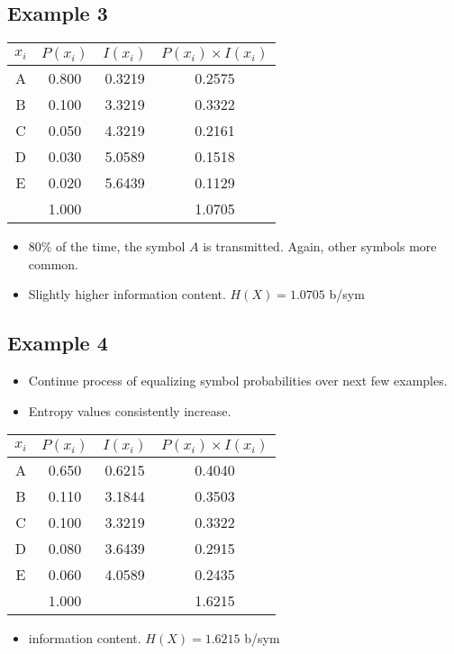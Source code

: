 \documentclass[12pt]{article}
\begin{document}
\subsection*{Example 3}
\begin{tabular}{|c|c|c|c|}
\hline
$x_i$	&	$P(x_i)$	&	$I(x_i)$	&	$P(x_i) \times I(x_i)$	\\ \hline	\hline
A	&	0.800	&	0.3219	&	0.2575	\\ \hline	
B	&	0.100	&	3.3219	&	0.3322	\\ \hline	
C	&	0.050	&	4.3219	&	0.2161	\\ \hline	
D	&	0.030	&	5.0589	&	0.1518	\\ \hline	
E	&	0.020	&	5.6439	&	0.1129	\\ \hline	
	&	1.000	&		&	1.0705	\\ \hline
\end{tabular} 
\begin{itemize}
\item 80\% of the time, the symbol $A$ is transmitted. Again, other symbols more common.
\item Slightly higher information content. $H(X) = 1.0705 $ b/sym
\end{itemize}
\subsection*{Example 4}
\begin{itemize}
\item Continue process of equalizing symbol probabilities over next few examples. 
\item Entropy values consistently increase. 
\end{itemize}
\begin{tabular}{|c|c|c|c|}
\hline
$x_i$	&	$P(x_i)$	&	$I(x_i)$	&	$P(x_i) \times I(x_i)$	\\ \hline	\hline
A	&	0.650	&	0.6215	&	0.4040	\\ \hline	
B	&	0.110	&	3.1844	&	0.3503	\\ \hline	
C	&	0.100	&	3.3219	&	0.3322	\\ \hline	
D	&	0.080	&	3.6439	&	0.2915	\\ \hline	
E	&	0.060	&	4.0589	&	0.2435	\\ \hline	
	&	1.000	&		&	1.6215	\\ \hline
\end{tabular} 
\begin{itemize}
\item information content. $H(X) = 1.6215 $ b/sym
\end{itemize}
\end{document}
